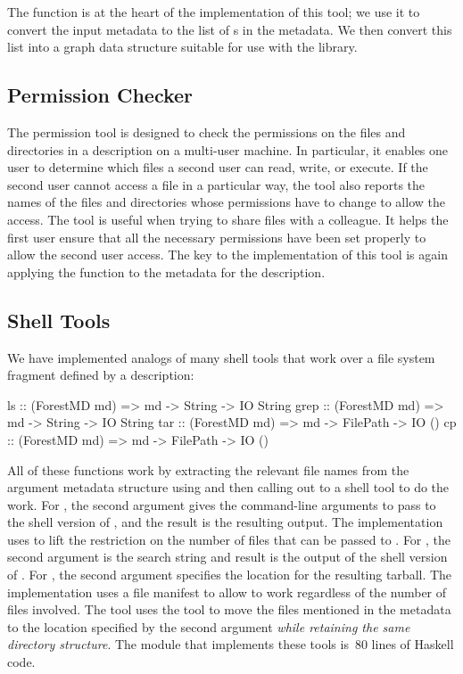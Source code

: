The  function is at the heart of the implementation of
this tool; we use it to convert the input metadata to the list of
s in the metadata.  We then convert this list into a
graph data structure suitable for use with the \graphviz{} library.

\subsection{Permission Checker}
The permission tool is designed to check the permissions on the files
and directories in a \forest{} description on a multi-user machine.
In particular, it enables one user to determine which files a second
user can read, write, or execute.  If the second user cannot access a
file in a particular way, the tool also reports the names of the files
and directories whose permissions have to change to allow the access.
The tool is useful when trying to share files with a colleague.  It
helps the first user ensure that all the necessary permissions
have been set properly to allow the second user access.  The key to
the implementation of this tool is again applying the 
function to the metadata for the \forest{} description.

\subsection{Shell Tools}
We have implemented analogs of many shell tools that work
over a file system fragment defined by a
\forest{} description:
\begin{code}
ls    :: (ForestMD md) => md -> String -> IO String
grep  :: (ForestMD md) => md -> String -> IO String
tar   :: (ForestMD md) => md -> FilePath -> IO ()
cp    :: (ForestMD md) => md -> FilePath -> IO ()
\end{code}
All of these functions work by extracting the relevant file names from
the argument metadata structure using  and then calling
out to a shell tool to do the work.  For , the second argument
gives the command-line arguments to pass to the shell version of
, and the result is the resulting output. The implementation
uses  to lift the restriction on the number of files that can
be passed to . For , the second argument is the 
search string and result is the output of the shell version of . For
, the second argument specifies the location for the resulting
tarball.  The implementation uses a file manifest to allow  to
work regardless of the number of files involved.  The  tool
uses the  tool to move the files mentioned in the metadata to
the location specified by the second argument \textit{while retaining
the same directory structure}.   
The module that implements these tools is~80 lines of Haskell code.

